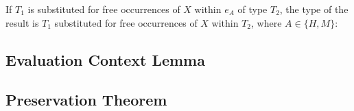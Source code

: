 If $T_{1}$ is substituted for free occurrences of $X$ within $e_{A}$ of type $T_{2}$, the type of the result is $T_{1}$ substituted for free occurrences of $X$ within $T_{2}$, where $A\in\lbrace H,M\rbrace$:



\subsection{Evaluation Context Lemma}



\subsection{Preservation Theorem}

